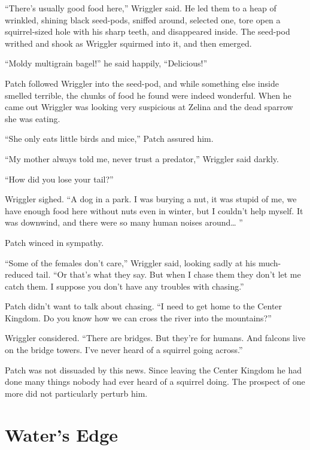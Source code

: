\documentclass[ebook,oneside,openany,12pt]{memoir}
\begin{document}
“There’s usually good food here,” Wriggler said. He led them to a heap
of wrinkled, shining black seed-pods, sniffed around, selected one,
tore open a squirrel-sized hole with his sharp teeth, and disappeared
inside. The seed-pod writhed and shook as Wriggler squirmed into it,
and then emerged.

“Moldy multigrain bagel!” he said happily, “Delicious!”

Patch followed Wriggler into the seed-pod, and while something else
inside smelled terrible, the chunks of food he found were indeed
wonderful. When he came out Wriggler was looking very suspicious at
Zelina and the dead sparrow she was eating.

“She only eats little birds and mice,” Patch assured him.

“My mother always told me, never trust a predator,” Wriggler said
darkly.

“How did you lose your tail?”

Wriggler sighed. “A dog in a park. I was burying a nut, it was stupid
of me, we have enough food here without nuts even in winter, but I
couldn’t help myself. It was downwind, and there were so many human
noises around… ”

Patch winced in sympathy.

“Some of the females don’t care,” Wriggler said, looking sadly at his
much-reduced tail. “Or that’s what they say. But when I chase them
they don’t let me catch them. I suppose you don’t have any troubles
with chasing.”

Patch didn’t want to talk about chasing. “I need to get home to the
Center Kingdom. Do you know how we can cross the river into the
mountains?”

Wriggler considered. “There are bridges. But they’re for humans. And
falcons live on the bridge towers. I’ve never heard of a squirrel
going across.”

Patch was not dissuaded by this news. Since leaving the Center Kingdom
he had done many things nobody had ever heard of a squirrel doing. The
prospect of one more did not particularly perturb him.


\section{Water’s Edge}
\end{document}
